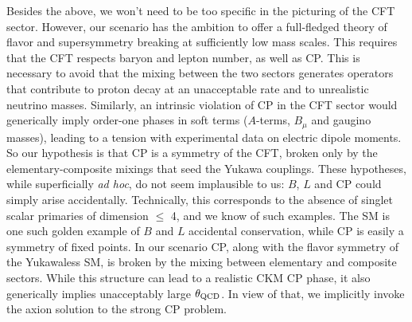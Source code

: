 \documentclass[a4paper,12pt]{article}
\begin{document}
Besides the above, we won't need to be too specific in the picturing of the CFT sector. However, our scenario has the ambition to offer a full-fledged theory of flavor and supersymmetry breaking at sufficiently low mass scales. This requires that the CFT respects baryon and lepton number, as well as CP. This is necessary to avoid that the mixing between the two sectors generates operators that contribute to proton decay at an unacceptable rate and to unrealistic neutrino masses. Similarly, an intrinsic violation of CP in the CFT sector would generically imply order-one phases in soft terms ($A$-terms, $B_\mu$ and gaugino masses), leading to a tension with experimental data on electric dipole moments. So our hypothesis is that CP is a symmetry of the CFT, broken only by the elementary-composite mixings that seed the Yukawa couplings. These hypotheses, while superficially {\it ad hoc}, do not seem implausible to us: $B$, $L$ and CP could simply arise accidentally. Technically, this corresponds to the absence of singlet scalar primaries of dimension $\le$ 4, and we know of such examples. The SM is one such golden example of  $B$ and $L$ accidental conservation, while CP is easily a symmetry of fixed points. In our scenario CP, along with the flavor symmetry of the Yukawaless SM, is broken by the mixing between elementary and composite sectors. While this structure can lead to a realistic CKM CP phase, it also generically implies unacceptably large $\theta_{\rm QCD}$. In view of that,
we implicitly invoke the axion solution to the strong CP problem.
\end{document}
